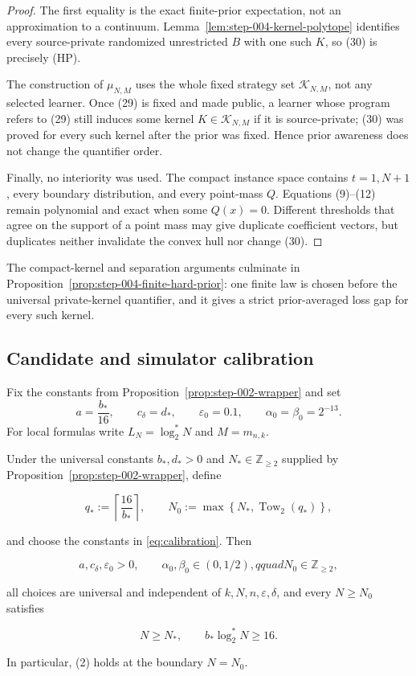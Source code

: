\begin{proof}
The first equality is the exact finite-prior expectation, not an
approximation to a continuum. Lemma~\ref{lem:step-004-kernel-polytope}
identifies every source-private randomized unrestricted \(B\) with one such
\(K\), so (30) is precisely (HP).

The construction of \(\mu_{N,M}\) uses the whole fixed strategy set
\(\mathcal K_{N,M}\), not any selected learner. Once (29) is fixed and made
public, a learner whose program refers to (29) still induces some kernel
\(K\in\mathcal K_{N,M}\) if it is source-private; (30) was proved for every
such kernel after the prior was fixed. Hence prior awareness does not change
the quantifier order.

Finally, no interiority was used. The compact instance space contains
\(t=1,N+1\), every boundary distribution, and every point-mass \(Q\).
Equations (9)--(12) remain polynomial and exact when some \(Q(x)=0\).
Different thresholds that agree on the support of a point mass may give
duplicate coefficient vectors, but duplicates neither invalidate the convex
hull nor change (30). \end{proof}
The compact-kernel and separation arguments culminate in
Proposition~\ref{prop:step-004-finite-hard-prior}: one finite law is chosen
before the universal private-kernel quantifier, and it gives a strict
prior-averaged loss gap for every such kernel.

\subsection{Candidate and simulator calibration}\label{app:step-005}
Fix the constants from Proposition~\ref{prop:step-002-wrapper} and set
\begin{equation}
a=\frac{b_*}{16},
\qquad c_\delta=d_*,
\qquad \varepsilon_0=0.1,
\qquad \alpha_0=\beta_0=2^{-13}.
\tag{C1}\label{eq:calibration}
\end{equation}
For local formulas write $L_N=\log_2^*N$ and $M=m_{n,k}$.
\begin{lemma}\label{lem:step-005-calibration}
Under the universal constants \(b_*,d_*>0\) and
\(N_*\in\mathbb Z_{\ge2}\) supplied by Proposition~\ref{prop:step-002-wrapper}, define

\[
q_*:=\left\lceil\frac{16}{b_*}\right\rceil,
\qquad
N_0:=\max\left\{N_*,\operatorname{Tow}_2(q_*)\right\},
\tag{1}
\]

and choose the constants in \eqref{eq:calibration}. Then

\[
a,c_\delta,\varepsilon_0>0,\qquad
\alpha_0,\beta_0\in(0,1/2),qquad
N_0\in\mathbb Z_{\ge2},
\]

all choices are universal and independent of \(k,N,n,\varepsilon,\delta\),
and every \(N\ge N_0\) satisfies

\[
N\ge N_*,
\qquad
b_*\log_2^*N\ge16.
\tag{2}
\]

In particular, (2) holds at the boundary \(N=N_0\).
\end{lemma}

